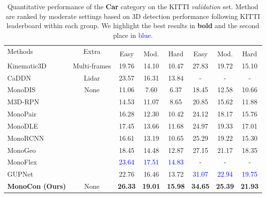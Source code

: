 \documentclass[letterpaper]{article} \usepackage{aaai22}  \usepackage{times}  \usepackage{helvet}  \usepackage{courier}  \usepackage[hyphens]{url}  \usepackage{graphicx} \urlstyle{rm} \def\UrlFont{\rm}  \usepackage{natbib}  \usepackage{caption} \DeclareCaptionStyle{ruled}{labelfont=normalfont,labelsep=colon,strut=off} \frenchspacing  \setlength{\pdfpagewidth}{8.5in}  \setlength{\pdfpageheight}{11in}  \usepackage{algorithm}
\begin{document}
\begin{table*}[ht]
\begin{center}

\begin{tabular}{l|c|ccc|ccc}
\toprule
\multirow{2}{*}{Methods} & \multirow{2}{*}{Extra} & \multicolumn{3}{c|}{\textit{}} & \multicolumn{3}{c}{\textit{}}\\
 & & Easy & Mod. & Hard & Easy & Mod. & Hard \\
\midrule

Kinematic3D \cite{kinematic3d} & Multi-frames & 19.76 & 14.10 & 10.47 & 27.83 & 19.72 & 15.10 \\
    
CaDDN \cite{caddn} & Lidar & 23.57 & 16.31 & 13.84 & - & - & - \\

\midrule
    
MonoDIS \cite{monodis} & \multirow{8}{*}{None} & 11.06 & 7.60 & 6.37 & 18.45 & 12.58 & 10.66 \\
    
M3D-RPN \cite{m3drpn} & & 14.53 & 11.07 & 8.65 & 20.85 & 15.62 & 11.88 \\
    
MonoPair \cite{monopair} & & 16.28 & 12.30 & 10.42 & 24.12 & 18.17 & 15.76\\
    
MonoDLE \cite{monodle} & & 17.45 & 13.66 & 11.68 & 24.97 & 19.33 & 17.01\\
    
MonoRCNN \cite{monorcnn} & & 16.61 & 13.19 & 10.65 & 25.29 & 19.22 & 15.30\\
    
MonoGeo \cite{monogeo} & & 18.45 & 14.48 & 12.87 & 27.15 & 21.17 & 18.35 \\
    
MonoFlex \cite{monoflex} & & \textcolor{blue}{23.64} & \textcolor{blue}{17.51} & \textcolor{blue}{14.83} & - & - & - \\
    
GUPNet \cite{gupnet} & & 22.76 & 16.46 & 13.72 & \textcolor{blue}{31.07} & \textcolor{blue}{22.94} & \textcolor{blue}{19.75} \\

\midrule

\textbf{MonoCon (Ours)} & None & \textbf{26.33} & \textbf{19.01} & \textbf{15.98} & \textbf{34.65} & \textbf{25.39} & \textbf{21.93}\\
    
\bottomrule
\end{tabular}
\end{center}
\caption{Quantitative performance of the \textbf{Car} category on the KITTI \textit{validation} set. Method are ranked by moderate settings based on 3D detection performance following KITTI leaderboard within each group. We highlight the best results in \textbf{bold} and the second place in \textcolor{blue}{blue}.}
\label{Tab:val}
\end{table*}
\end{document}
